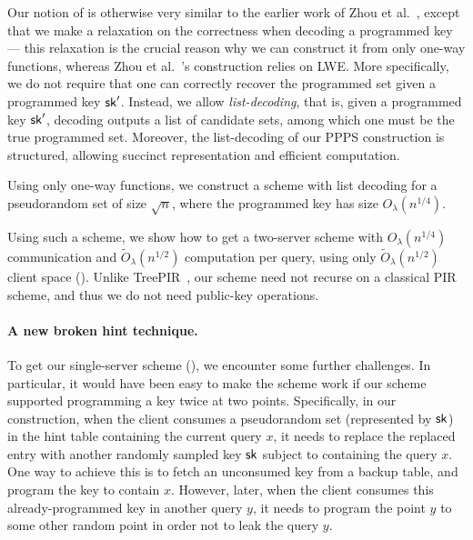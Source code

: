 Our notion of \ppps is otherwise very similar
to the earlier work of Zhou et al.~\cite{pir-ec23}, except
that we make a relaxation on the correctness when  
decoding a 
programmed key --- this relaxation 
is the crucial
reason why we can construct it from only one-way functions,
whereas Zhou et al.~\cite{pir-ec23}'s construction relies
on LWE.
More specifically,  
we do not require that one can correctly recover
the programmed set given a programmed key $\mathsf{sk}'$.
Instead, we allow {\it list-decoding}, that is, given
a programmed key $\mathsf{sk}'$, decoding outputs a list of candidate
sets, among which one must be the true programmed set.
Moreover, the list-decoding of our PPPS construction is structured, allowing succinct representation and efficient computation.

Using only one-way functions, we construct 
a \ppps scheme with list decoding 
for a pseudorandom set of size $\sqrt{n}$, where
the programmed key 
has size $O_\lambda(n^{1/4})$.


Using such a \ppps scheme, 
we show how to get a two-server
scheme 
with 
${O}_\lambda(n^{1/4})$ communication and  
$\widetilde{O}_\lambda(n^{1/2})$ computation  
per query, using only $\widetilde{O}_\lambda(n^{1/2})$ client space ().
Unlike TreePIR~\cite{treepir}, our scheme need not recurse
on a classical PIR scheme, and thus we do not need public-key operations. 



\paragraph{A new broken hint technique.}
To get our single-server scheme (), we encounter
some further challenges. 
In particular, 
it would have been easy to make the scheme work
if our \ppps scheme supported programming a key twice
at two points.
Specifically, in our construction, when the client
consumes a pseudorandom set (represented by $\mathsf{sk}$)
in the hint table
containing the current query $x$, 
it needs to replace the replaced entry with another
randomly sampled \ppps key $\mathsf{sk}$ 
subject to containing the query $x$.
One way to achieve this is to fetch an unconsumed key  
from a backup table, and program the key 
to contain $x$.
However, later, when the client consumes this already-programmed
key in another query $y$, it needs to program  
the point $y$ to 
 some other random point in order not to leak the query $y$.

